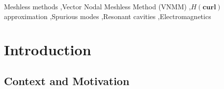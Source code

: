 \documentclass[preprint,12pt]{elsarticle}
\begin{document}
\begin{frontmatter}


    \begin{keyword}
        Meshless methods \sep Vector Nodal Meshless Method (VNMM) \sep $H(\mathbf{curl})$ approximation \sep Spurious modes \sep Resonant cavities \sep Electromagnetics


    \end{keyword}

\end{frontmatter}

\linenumbers

\section{Introduction}
\label{sec:intro}

\subsection{Context and Motivation}
\label{subsec:context_motivation}
\end{document}
